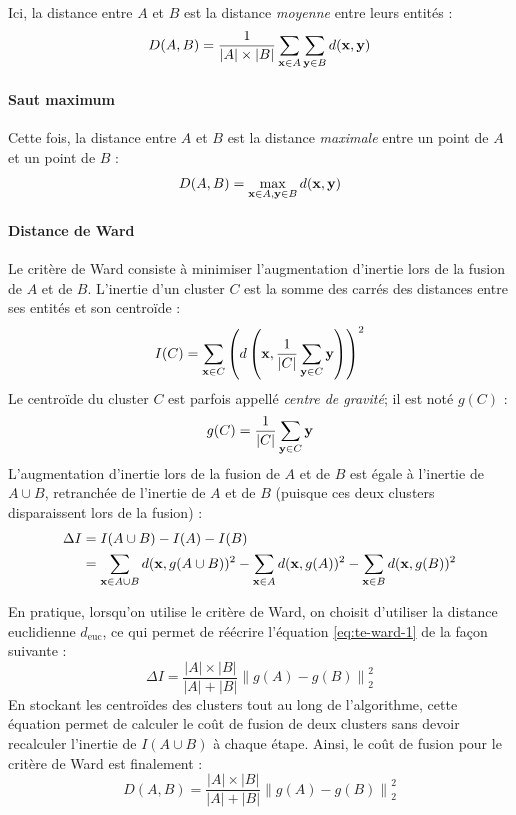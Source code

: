 Ici, la distance entre $A$ et $B$ est la distance \textit{moyenne} entre leurs entités :
\begin{equation}
    D(A, B) = \frac{1}{|A| \times |B|} \sum_{\bf{x} \in A} \sum_{\bf{y} \in B} d(\bf{x}, \bf{y})
\end{equation}

\paragraph{Saut maximum}

Cette fois, la distance entre $A$ et $B$ est la distance \textit{maximale} entre un point de $A$ et un point de $B$ :
\begin{equation}
    D(A, B) = \max_{\bf{x} \in A, \bf{y} \in B} d(\bf{x}, \bf{y})
\end{equation}

\paragraph{Distance de Ward}

Le critère de Ward consiste à minimiser l'augmentation d'inertie lors de la fusion de $A$ et de $B$. L'inertie d'un cluster $C$ est la somme des carrés des distances entre ses entités et son centroïde :
\begin{equation}
    I(C) = \sum_{\bf{x} \in C} \left(d\left(\bf{x}, \frac{1}{|C|} \sum_{\bf{y} \in C} \bf{y}\right)\right)^2
\end{equation}
Le centroïde du cluster $C$ est parfois appellé \textit{centre de gravité}; il est noté $g(C)$ :
\begin{equation}
    g(C) = \frac{1}{|C|} \sum_{\bf{y} \in C} \bf{y}
\end{equation}
L'augmentation d'inertie lors de la fusion de $A$ et de $B$ est égale à l'inertie de $A \cup B$, retranchée de l'inertie de $A$ et de $B$ (puisque ces deux clusters disparaissent lors de la fusion) :
\begin{align}
    \Delta I &= I(A \cup B) - I(A) - I(B) \nonumber \\
    &= \sum_{\bf{x} \in A\cup B} d(\bf{x}, g(A \cup B) )^2
    - \sum_{\bf{x} \in A} d(\bf{x}, g(A) )^2
    - \sum_{\bf{x} \in B} d(\bf{x}, g(B) )^2
    \label{eq:te-ward-1}
\end{align}

En pratique, lorsqu'on utilise le critère de Ward, on choisit d'utiliser la distance euclidienne $d_\text{euc}$, ce qui permet de réécrire l'équation \ref{eq:te-ward-1} de la façon suivante :
\begin{equation}
    \Delta I = \frac{|A| \times |B|}{|A| + |B|} \left\| g(A) - g(B) \right\|_2^2
\end{equation}
En stockant les centroïdes des clusters tout au long de l'algorithme, cette équation permet de calculer le coût de fusion de deux clusters sans devoir recalculer l'inertie de $I(A\cup B)$ à chaque étape. Ainsi, le coût de fusion pour le critère de Ward est finalement :
\begin{equation}
    D(A, B) = \frac{|A| \times |B|}{|A| + |B|} \left\| g(A) - g(B) \right\|_2^2
\end{equation}

